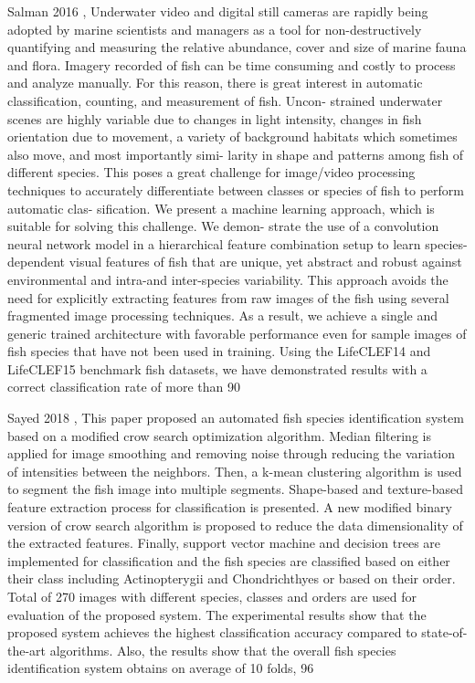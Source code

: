 Salman 2016 \cite{Salman2016FishSC},
Underwater video and digital still cameras are rapidly being adopted by marine scientists and managers as a tool for non-destructively quantifying and measuring the relative abundance, cover and size of marine fauna and flora. Imagery recorded of fish can be time consuming and costly to process and analyze manually. For this reason, there is great interest in automatic classification, counting, and measurement of fish. Uncon- strained underwater scenes are highly variable due to changes in light intensity, changes in fish orientation due to movement, a variety of background habitats which sometimes also move, and most importantly simi- larity in shape and patterns among fish of different species. This poses a great challenge for image/video processing techniques to accurately differentiate between classes or species of fish to perform automatic clas- sification. We present a machine learning approach, which is suitable for solving this challenge. We demon- strate the use of a convolution neural network model in a hierarchical feature combination setup to learn species-dependent visual features of fish that are unique, yet abstract and robust against environmental and intra-and inter-species variability. This approach avoids the need for explicitly extracting features from raw images of the fish using several fragmented image processing techniques. As a result, we achieve a single and generic trained architecture with favorable performance even for sample images of fish species that have not been used in training. Using the LifeCLEF14 and LifeCLEF15 benchmark fish datasets, we have demonstrated results with a correct classification rate of more than 90%

Sayed 2018 \cite{SayedGehadIsmail2018AAFS},
This paper proposed an automated fish species identification system based on a modified crow search optimization algorithm. Median filtering is applied for image smoothing and removing noise through reducing the variation of intensities between the neighbors. Then, a k-mean clustering algorithm is used to segment the fish image into multiple segments. Shape-based and texture-based feature extraction process for classification is presented. A new modified binary version of crow search algorithm is proposed to reduce the data dimensionality of the extracted features. Finally, support vector machine and decision trees are implemented for classification and the fish species are classified based on either their class including Actinopterygii and Chondrichthyes or based on their order. Total of 270 images with different species, classes and orders are used for evaluation of the proposed system. The experimental results show that the proposed system achieves the highest classification accuracy compared to state-of-the-art algorithms. Also, the results show that the overall fish species identification system obtains on average of 10 folds, 96%

